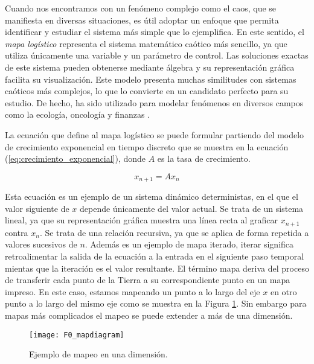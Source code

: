         Cuando nos encontramos con un fenómeno complejo como el caos, que se manifiesta en diversas situaciones, es útil adoptar un enfoque que permita identificar y estudiar el sistema más simple que lo ejemplifica. En este sentido, el \emph{mapa logístico} representa el sistema matemático caótico más sencillo, ya que utiliza únicamente una variable y un parámetro de control. Las soluciones exactas de este sistema pueden obtenerse mediante álgebra y su representación gráfica facilita su visualización. Este modelo presenta muchas similitudes con sistemas caóticos más complejos, lo que lo convierte en un candidato perfecto para su estudio. De hecho, ha sido utilizado para modelar fenómenos en diversos campos como la ecología, oncología y finanzas \cite{Sprott2003}.

        La ecuación que define al mapa logístico se puede formular partiendo del modelo de crecimiento exponencial en tiempo discreto que se muestra en la ecuación (\ref{eq:crecimiento_exponencial}), donde $A$ es la tasa de crecimiento.

        \begin{equation}
            x_{n+1} = A x_{n}
            \label{eq:crecimiento_exponencial}
        \end{equation}

        Esta ecuación es un ejemplo de un sistema dinámico deterministas, en el que el valor siguiente de $x$ depende únicamente del valor actual. Se trata de un sistema lineal, ya que su representación gráfica muestra una línea recta al graficar $x_{n+1}$ contra $x_{n}$. Se trata de una relación recursiva, ya que se aplica de forma repetida a valores sucesivos de $n$. Además es un ejemplo de mapa iterado, iterar significa retroalimentar la salida de la ecuación a la entrada en el siguiente paso temporal mientas que la iteración es el valor resultante. El término mapa deriva del proceso de transferir cada punto de la Tierra a su correspondiente punto en un mapa impreso. En este caso, estamos mapeando un punto a lo largo del eje $x$ en otro punto a lo largo del mismo eje como se muestra en la Figura \ref{fig:F0_mapdiagram}. Sin embargo para mapas más complicados el mapeo se puede extender a más de una dimensión. 


        \begin{figure}[hbtp]
            \centering
            \texttt{[image: F0\_mapdiagram]}
            \caption{Ejemplo de mapeo en una dimensión.}
            \label{fig:F0_mapdiagram}
        \end{figure}


